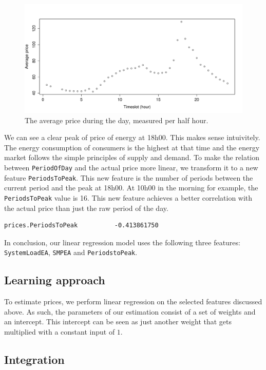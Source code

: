 \documentclass{article}
\begin{document}
\begin{figure}
	\centering
	\includegraphics[width=\textwidth]{img/timeslot_averageprice.pdf}
	\caption{The average price during the day, measured per half hour.}
	\label{fig:timeslot_average}
\end{figure}

We can see a clear peak of price of energy at 18h00. This makes sense intuivitely. The energy consumption of consumers is the highest at that time and the energy market follows the simple principles of supply and demand. To make the relation between \verb|PeriodOfDay| and the actual price more linear, we transform it to a new feature \verb|PeriodsToPeak|. This new feature is the number of periods between the current period and the peak at 18h00. At 10h00 in the morning for example, the \verb|PeriodsToPeak| value is 16. This new feature achieves a better correlation with the actual price than just the raw period of the day.
\begin{verbatim}
prices.PeriodsToPeak          -0.413861750
\end{verbatim}
In conclusion, our linear regression model uses the following three features: \verb|SystemLoadEA|, \verb|SMPEA| and \verb|PeriodstoPeak|.

\subsection{Learning approach}
To estimate prices, we perform linear regression on the selected features discussed above. As such, the parameters of our estimation consist of a set of weights and an intercept. This intercept can be seen as just another weight that gets multiplied with a constant input of $1$.

\subsection{Integration}
\end{document}

